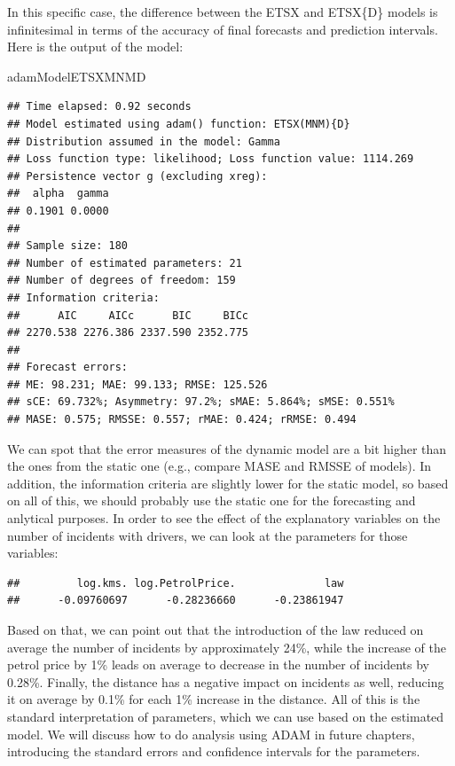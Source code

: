 \documentclass[
]{book}
\newenvironment{Shaded}{\begin{snugshade}}{\end{snugshade}}
\newcommand{\NormalTok}[1]{#1}
\newcommand{\SpecialCharTok}[1]{\textcolor[rgb]{0.00,0.00,0.00}{#1}}
\theoremstyle{definition}
\theoremstyle{definition}
\theoremstyle{definition}
\theoremstyle{definition}
\theoremstyle{remark}
\begin{document}
In this specific case, the difference between the ETSX and ETSX\{D\} models is infinitesimal in terms of the accuracy of final forecasts and prediction intervals. Here is the output of the model:

\begin{Shaded}
\begin{Highlighting}[]
\NormalTok{adamModelETSXMNMD}
\end{Highlighting}
\end{Shaded}

\begin{verbatim}
## Time elapsed: 0.92 seconds
## Model estimated using adam() function: ETSX(MNM){D}
## Distribution assumed in the model: Gamma
## Loss function type: likelihood; Loss function value: 1114.269
## Persistence vector g (excluding xreg):
##  alpha  gamma 
## 0.1901 0.0000 
## 
## Sample size: 180
## Number of estimated parameters: 21
## Number of degrees of freedom: 159
## Information criteria:
##      AIC     AICc      BIC     BICc 
## 2270.538 2276.386 2337.590 2352.775 
## 
## Forecast errors:
## ME: 98.231; MAE: 99.133; RMSE: 125.526
## sCE: 69.732%; Asymmetry: 97.2%; sMAE: 5.864%; sMSE: 0.551%
## MASE: 0.575; RMSSE: 0.557; rMAE: 0.424; rRMSE: 0.494
\end{verbatim}

We can spot that the error measures of the dynamic model are a bit higher than the ones from the static one (e.g., compare MASE and RMSSE of models). In addition, the information criteria are slightly lower for the static model, so based on all of this, we should probably use the static one for the forecasting and anlytical purposes. In order to see the effect of the explanatory variables on the number of incidents with drivers, we can look at the parameters for those variables:

\begin{Shaded}
\end{Shaded}

\begin{verbatim}
##         log.kms. log.PetrolPrice.              law 
##      -0.09760697      -0.28236660      -0.23861947
\end{verbatim}

Based on that, we can point out that the introduction of the law reduced on average the number of incidents by approximately 24\%, while the increase of the petrol price by 1\% leads on average to decrease in the number of incidents by 0.28\%. Finally, the distance has a negative impact on incidents as well, reducing it on average by 0.1\% for each 1\% increase in the distance. All of this is the standard interpretation of parameters, which we can use based on the estimated model. We will discuss how to do analysis using ADAM in future chapters, introducing the standard errors and confidence intervals for the parameters.
\end{document}
